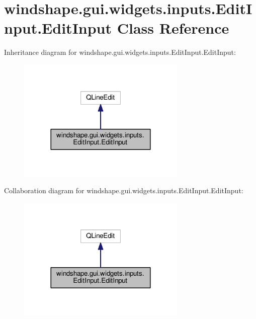 \hypertarget{classwindshape_1_1gui_1_1widgets_1_1inputs_1_1_edit_input_1_1_edit_input}{}\section{windshape.\+gui.\+widgets.\+inputs.\+Edit\+Input.\+Edit\+Input Class Reference}
\label{classwindshape_1_1gui_1_1widgets_1_1inputs_1_1_edit_input_1_1_edit_input}


Inheritance diagram for windshape.\+gui.\+widgets.\+inputs.\+Edit\+Input.\+Edit\+Input\+:\nopagebreak
\begin{figure}[H]
\begin{center}
\leavevmode
\includegraphics[width=228pt]{classwindshape_1_1gui_1_1widgets_1_1inputs_1_1_edit_input_1_1_edit_input__inherit__graph}
\end{center}
\end{figure}


Collaboration diagram for windshape.\+gui.\+widgets.\+inputs.\+Edit\+Input.\+Edit\+Input\+:\nopagebreak
\begin{figure}[H]
\begin{center}
\leavevmode
\includegraphics[width=228pt]{classwindshape_1_1gui_1_1widgets_1_1inputs_1_1_edit_input_1_1_edit_input__coll__graph}
\end{center}
\end{figure}
